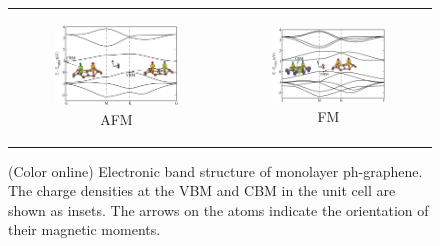 \begin{figure}[htbp]
  \centering
  \begin{tabular}{cc}
  \begin{subfigure}{0.5\textwidth}
    \captionsetup{justification=justified, singlelinecheck=false}
    \includegraphics[scale=0.3]{PG_band-AFM.eps}%
    \caption{AFM}
  \end{subfigure} &
  \begin{subfigure}{0.5\textwidth}
    \captionsetup{justification=justified, singlelinecheck=false}
    \includegraphics[scale=0.3]{PG_band-FM.eps}%
    \caption{FM}
  \end{subfigure}    
  \end{tabular}
\caption{ (Color online) Electronic band structure of monolayer ph-graphene. The charge densities at the VBM and CBM in the unit cell are shown as insets. The arrows on the atoms indicate the orientation of their magnetic moments.\label{electronic} }
\end{figure}


